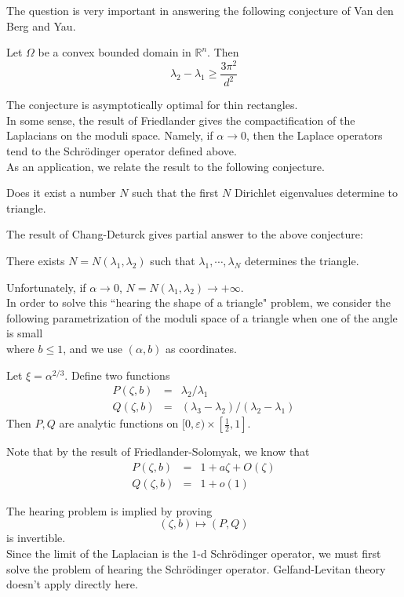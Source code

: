 The question is very important in answering the following conjecture of 
Van den Berg and Yau.
\begin{conjecture}
Let $\Omega$ be a convex bounded domain in $\mathbb{R}^n$. Then
\[
\lambda_2 - \lambda_1 \geqslant \frac{3\pi^2}{d^2}
\]
\end{conjecture}
The conjecture is asymptotically optimal for thin rectangles.
\\

In some sense, the result of Friedlander gives the compactification of the
Laplacians on the moduli space. Namely, if $\alpha\rightarrow 0$, then the
Laplace operators tend to the Schr\"{o}dinger operator defined above.
\\

As an application, we relate the result to the following conjecture.
\begin{conjecture}
Does it exist a number $N$ such that the first $N$ Dirichlet eigenvalues
determine to triangle.
\end{conjecture}

The result of Chang-Deturck gives partial answer to the above conjecture:
\begin{theorem}
There exists $N = N(\lambda_1, \lambda_2)$ such that 
$\lambda_1, \cdots, \lambda_N$ determines the triangle.
\end{theorem}

Unfortunately, if $\alpha\rightarrow 0$, $N = N(\lambda_1,\lambda_2)\rightarrow
+\infty$.
\\

In order to solve this ``hearing the shape of a triangle" problem, we consider
the following parametrization of the moduli space of a triangle when one of the
angle is small
\\%
where $b\leqslant 1$, and we use $(\alpha, b)$ as coordinates.
\begin{conjecture}
Let $\xi = \alpha^{2/3}$. Define two functions
\begin{eqnarray}
\nonumber P(\zeta, b) & = & \lambda_2 / \lambda_1 \\
\nonumber Q(\zeta, b) & = & (\lambda_3 - \lambda_2)/(\lambda_2 - \lambda_1)
\end{eqnarray}
Then $P,Q$ are analytic functions on $[0, \varepsilon) \times[\frac{1}{2}, 1]$.
\end{conjecture}

Note that by the result of Friedlander-Solomyak, we know that
\begin{eqnarray}
\nonumber P(\zeta, b) & = & 1 + a\zeta + O(\zeta) \\
\nonumber Q(\zeta, b) & = & 1 + o(1)
\end{eqnarray}

The hearing problem is implied by proving
\[
(\zeta, b) \mapsto (P,Q)
\]
is invertible.
\\

Since the limit of the Laplacian is the $1$-d Schr\"{o}dinger operator, we must
first solve the problem of hearing the Schr\"{o}dinger operator. Gelfand-Levitan
theory doesn't apply directly here.


